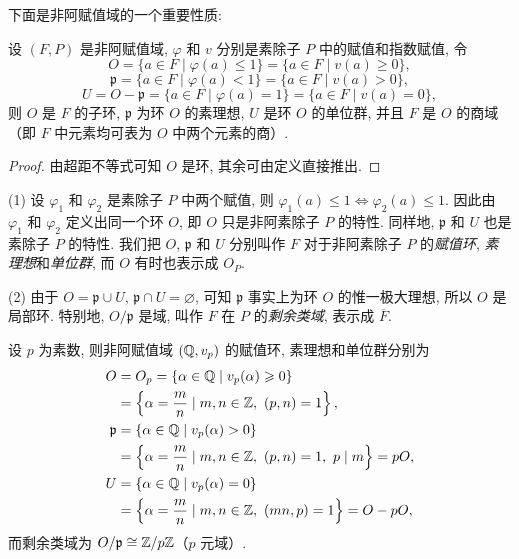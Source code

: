 下面是非阿赋值域的一个重要性质:

\begin{lemma}\label{lem:ch7-6}
设 $(F,P)$ 是非阿赋值域, $\varphi$ 和 $v$ 分别是素除子 $P$ 中的赋值和指数赋值, 令
\[
  O=\{a\in F\mid\varphi(a)\leqslant 1\}=\{a\in F\mid v(a)\geqslant 0\},
\]
\[
  \mathfrak{p}=\{a\in F\mid\varphi(a)<1\}=\{a\in F\mid v(a)>0\},
\]
\[
  U=O-\mathfrak{p}=\{a\in F\mid\varphi(a)=1\}=\{a\in F\mid v(a)=0\},
\]
则 $O$ 是 $F$ 的子环, $\mathfrak{p}$ 为环 $O$ 的素理想, $U$ 是环 $O$ 的单位群, 并且 $F$ 是 $O$ 的商域（即 $F$ 中元素均可表为 $O$ 中两个元素的商）.
\end{lemma}

\begin{proof}
由超距不等式可知 $O$ 是环, 其余可由定义直接推出.
\end{proof}

\begin{remark}
(1) 设 $\varphi_1$ 和 $\varphi_2$ 是素除子 $P$ 中两个赋值, 则 $\varphi_1(a)\leqslant 1\Leftrightarrow\varphi_2(a)\leqslant 1$. 因此由 $\varphi_1$ 和 $\varphi_2$ 定义出同一个环 $O$, 即 $O$ 只是非阿素除子 $P$ 的特性. 同样地, $\mathfrak{p}$ 和 $U$ 也是素除子 $P$ 的特性. 我们把 $O$, $\mathfrak{p}$ 和 $U$ 分别叫作 $F$ 对于非阿素除子 $P$ 的\emph{赋值环}, \emph{素理想}和\emph{单位群}, 而 $O$ 有时也表示成 $O_P$.

(2) 由于 $O=\mathfrak{p}\cup U$, $\mathfrak{p}\cap U=\varnothing$, 可知 $\mathfrak{p}$ 事实上为环 $O$ 的惟一极大理想, 所以 $O$ 是局部环. 特别地, $O/\mathfrak{p}$ 是域, 叫作 $F$ 在 $P$ 的\emph{剩余类域}, 表示成 $\overline{F}$.
\end{remark}

\begin{example}
设 $p$ 为素数, 则非阿赋值域 $(\mathbb{Q},v_p)$ 的赋值环, 素理想和单位群分别为
\begin{align*}
  O&=O_p=\{\alpha\in\mathbb{Q}\mid v_p(\alpha)\geqslant 0\}\\
  &=\left\{\alpha=\frac{m}{n}\mid m,n\in\mathbb{Z},\ (p,n)=1\right\},\\
  \mathfrak{p}&=\{\alpha\in\mathbb{Q}\mid v_p(\alpha)>0\}\\
  &=\left\{\alpha=\frac{m}{n}\mid m,n\in\mathbb{Z},\ (p,n)=1,\ p\mid m\right\}=pO,\\
  U&=\{\alpha\in\mathbb{Q}\mid v_p(\alpha)=0\}\\
  &=\left\{\alpha=\frac{m}{n}\mid m,n\in\mathbb{Z},\ (mn,p)=1\right\}=O-pO,
\end{align*}
而剩余类域为 $O/\mathfrak{p}\cong\mathbb{Z}/p\mathbb{Z}$（$p$ 元域）.
\end{example}


